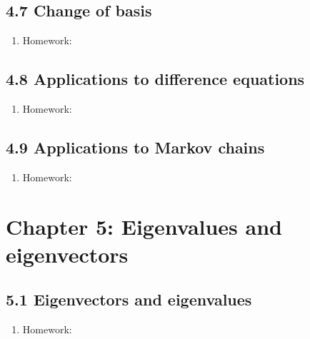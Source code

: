 \documentclass{article}
\begin{document}
\subsection{4.7 Change of basis}

\begin{enumerate}

\item Homework: 

\end{enumerate}

\subsection{4.8 Applications to difference equations}

\begin{enumerate}

\item Homework: 

\end{enumerate}

\subsection{4.9 Applications to Markov chains}

\begin{enumerate}

\item Homework: 

\end{enumerate}


\section{Chapter 5: Eigenvalues and eigenvectors} 

\subsection{5.1 Eigenvectors and eigenvalues}

\begin{enumerate}

\item Homework: 

\end{enumerate}
\end{document}
